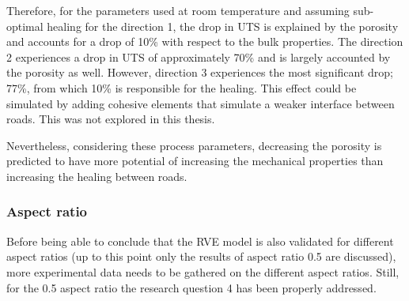 Therefore, for the parameters used at room temperature and assuming sub-optimal healing for the direction 1, the drop in UTS is explained by the porosity and accounts for a drop of 10\% with respect to the bulk properties. The direction 2 experiences a drop in UTS of approximately 70\% and is largely accounted by the porosity as well. However, direction 3 experiences the most significant drop; 77\%, from which 10\% is responsible for the healing. This effect could be simulated by adding cohesive elements that simulate a weaker interface between roads. This was not explored in this thesis.

Nevertheless, considering these process parameters, decreasing the porosity is predicted to have more potential of increasing the mechanical properties than increasing the healing between roads. 
\subsubsection{Aspect ratio}
Before being able to conclude that the RVE model is also validated for different aspect ratios (up to this point only the results of aspect ratio 0.5 are discussed), more experimental data needs to be gathered on the different aspect ratios. Still, for the 0.5 aspect ratio the research question 4 has been properly addressed. 

